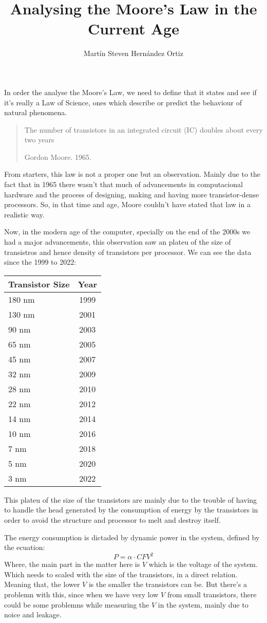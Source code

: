 \documentclass{article}
\author{Martín Steven Hernández Ortiz}
\title{Analysing the Moore's Law in the Current Age}
\begin{document}
\maketitle

In order the analyse the Moore's Law, we need to define that it states and see 
if it's really a Law of Science, ones which describe or predict the behaviour of 
natural phenomena.

\blockquote[Gordon Moore. 1965.]{The number of transistors in an integrated circuit (IC) doubles about every two years}

From starters, this law is not a proper one but an observation.
Mainly due to the fact that in 1965 there wasn't that much of advancements in 
computacional hardware and the process of designing, making and having more 
transistor-dense processors. So, in that time and age, Moore couldn't have 
stated that law in a realistic way.

Now, in the modern age of the computer, specially on the end of the 2000s we 
had a major advancements, this observation saw an plateu of the size of transistros 
and hence density of transistors per processor. We can see the data since the 1999 to 2022:

\begin{tabular}{lc}
    \toprule
    Transistor Size & Year \\
    \midrule
    180 nm & 1999 \\
    130 nm & 2001 \\
    90 nm & 2003 \\
    65 nm & 2005 \\
    45 nm & 2007 \\
    32 nm & 2009 \\
    28 nm & 2010 \\
    22 nm & 2012 \\
    14 nm & 2014 \\
    10 nm & 2016 \\
    7 nm & 2018 \\
    5 nm & 2020 \\
    3 nm & 2022 \\
    \bottomrule
\end{tabular}

This plateu of the size of the transistors are mainly due to the trouble of having to handle the head generated 
by the consumption of energy by the transistors in order to avoid the structure and processor to melt and destroy itself.

The energy consumption is dictaded by dynamic power in the system, defined by the ecuation:
\[
    P = \alpha \cdot CFV^{2}
\]
Where, the main part in the matter here is $V$ which is the voltage of the system.
Which needs to scaled with the size of the transistors, in a direct relation. Meaning that, the lower $V$ is 
the smaller the transistors can be. But there's a problemn with this, since when we have very low $V$ from small 
transistors, there could be some problemns while measuring the $V$ in the system, mainly due to noice and leakage.
\end{document}
